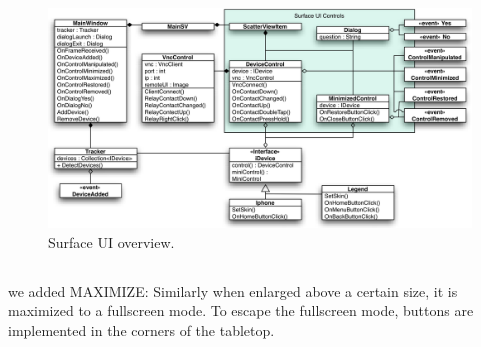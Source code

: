 \begin{figure}[htb]
  \centering
    \includegraphics[width=1\textwidth]{images/surfaceDiagram}
    \caption{Surface UI overview.}
    \label{fig:surfaceDiagram}
\end{figure}


\subsection{}

we added MAXIMIZE:
Similarly when enlarged above a certain size, it is maximized to a fullscreen mode. To escape the fullscreen mode, buttons are implemented in the corners of the tabletop.





